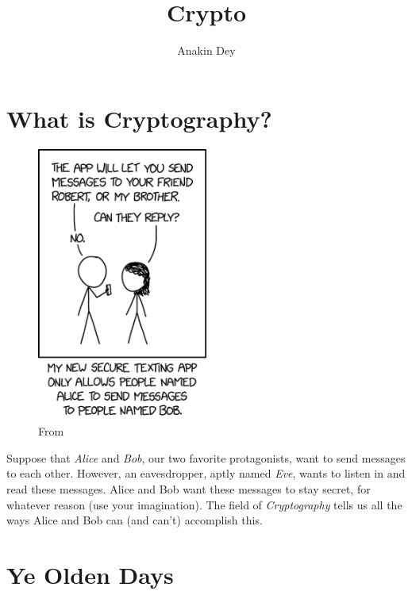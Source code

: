 \documentclass[letterpaper]{article}
\title{Crypto}
\author{Anakin Dey}
\begin{document}
\maketitle

\section*{What is Cryptography?}

\begin{minipage}[c]{0.45\textwidth}
\begin{figure}[H]
  \centering
  \includegraphics[width=0.5\textwidth]{alice_bob.png}
  \caption{From \cite{site:xkcd}}\label{fig:xkcd}
\end{figure}
\end{minipage}
\begin{minipage}[c]{0.5\textwidth}
Suppose that \emph{Alice} and \emph{Bob}, our two favorite protagonists, want to send messages to each other.
However, an eavesdropper, aptly named \emph{Eve}, wants to listen in and read these messages.
Alice and Bob want these messages to stay secret, for whatever reason (use your imagination).
The field of \emph{Cryptography} tells us all the ways Alice and Bob can (and can't) accomplish this.
\end{minipage}



\section*{Ye Olden Days}
\end{document}
